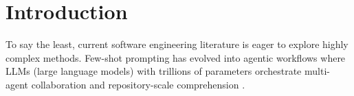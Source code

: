 \documentclass[AMA,STIX2COL]{WileyNJDv5}
\begin{document}



\maketitle   
\section{Introduction}\label{sec1}



To say the least, current software engineering literature is eager to explore
highly complex methods. Few-shot prompting has evolved into agentic workflows
where LLMs (large language models) with trillions of parameters orchestrate
multi-agent collaboration and repository-scale comprehension
\cite{ma2023scope,wang2022machine,Dong2025SurveyCodeAgents,DBLP:journals/corr/abs-2507-15003}.

\newtheorem{obs}{Observation}
\end{document}
